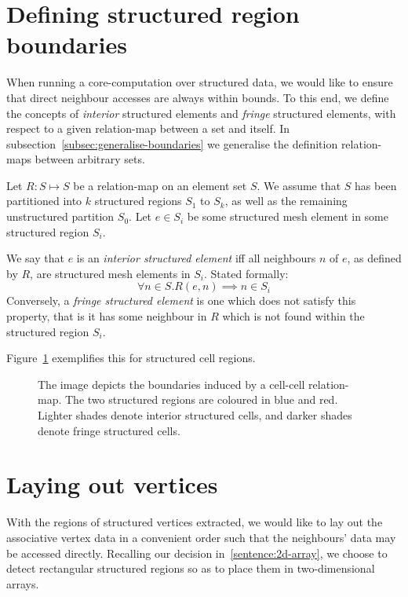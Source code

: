 
\section{Defining structured region boundaries}
When running a core-computation over structured data, we would like to ensure that direct neighbour accesses are always within bounds. To this end, we define the concepts of \emph{interior} structured elements and \emph{fringe} structured elements, with respect to a given relation-map between a set and itself. In subsection~\ref{subsec:generalise-boundaries} we generalise the definition relation-maps between arbitrary sets.

Let $R: S \mapsto S$ be a relation-map on an element set $S$. We assume that $S$ has been partitioned into $k$ structured regions $S_1$ to $S_k$, as well as the remaining unstructured partition $S_0$.
Let $e \in S_i$ be some structured mesh element in some structured region $S_i$.

We say that $e$ is an \emph{interior structured element} iff all neighbours $n$ of $e$, as defined by $R$, are structured mesh elements in $S_i$. Stated formally:
$$\forall n \in S. R(e,n) \implies n \in S_i$$
Conversely, a \emph{fringe structured element} is one which does not satisfy this property, that is it has some neighbour in $R$ which is not found within the structured region $S_i$.

Figure~\ref{fig:fringe-cells} exemplifies this for structured cell regions.

\begin{figure}

\caption{The image depicts the boundaries induced by a cell-cell relation-map. The two structured regions are coloured in blue and red. Lighter shades denote interior structured cells, and darker shades denote fringe structured cells.}
\label{fig:fringe-cells}
\end{figure}


\section{Laying out vertices}
\label{subsec:vertex-associative-data}
With the regions of structured vertices extracted, we would like to lay out the associative vertex data in a convenient order such that the neighbours' data may be accessed directly. Recalling our decision in~\ref{sentence:2d-array}, we choose to detect rectangular structured regions so as to place them in two-dimensional arrays.

